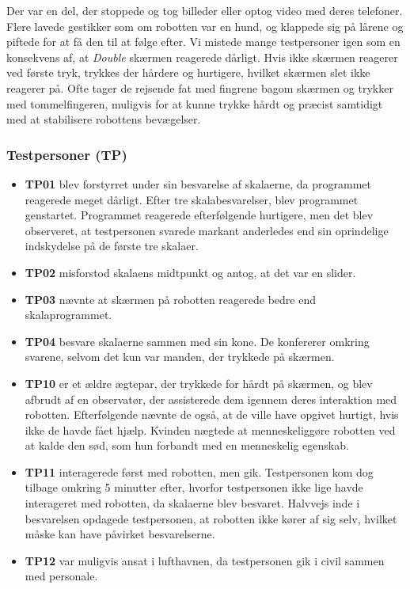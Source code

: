 Der var en del, der stoppede og tog billeder eller optog video med deres telefoner. Flere lavede gestikker som om robotten var en hund, og klappede sig på lårene og piftede for at få den til at følge efter. Vi mistede mange testpersoner igen som en konsekvens af, at \textit{Double} skærmen reagerede dårligt. Hvis ikke skærmen reagerer ved første tryk, trykkes der hårdere og hurtigere, hvilket skærmen slet ikke reagerer på. Ofte tager de rejsende fat med fingrene bagom skærmen og trykker med tommelfingeren, muligvis for at kunne trykke hårdt og præcist samtidigt med at stabilisere robottens bevægelser.

\subsubsection{Testpersoner (TP)}
\begin{itemize}
\item \textbf{TP01} blev forstyrret under sin besvarelse af skalaerne, da programmet reagerede meget dårligt. Efter tre skalabesvarelser, blev programmet genstartet. Programmet reagerede efterfølgende hurtigere, men det blev observeret, at testpersonen svarede markant anderledes end sin oprindelige indskydelse på de første tre skalaer. 
\item \textbf{TP02} misforstod skalaens midtpunkt og antog, at det var en slider. 
\item \textbf{TP03} nævnte at skærmen på robotten reagerede bedre end skalaprogrammet.
\item \textbf{TP04} besvare skalaerne sammen med sin kone. De konfererer omkring svarene, selvom det kun var manden, der trykkede på skærmen.
\item \textbf{TP10} er et ældre ægtepar, der trykkede for hårdt på skærmen, og blev afbrudt af en observatør, der assisterede dem igennem deres interaktion med robotten. Efterfølgende nævnte de også, at de ville have opgivet hurtigt, hvis ikke de havde fået hjælp. Kvinden nægtede at menneskeliggøre robotten ved at kalde den sød, som hun forbandt med en menneskelig egenskab.
\item \textbf{TP11} interagerede først med robotten, men gik. Testpersonen kom dog tilbage omkring 5 minutter efter, hvorfor testpersonen ikke lige havde interageret med robotten, da skalaerne blev besvaret. Halvvejs inde i besvarelsen opdagede testpersonen, at robotten ikke kører af sig selv, hvilket måske kan have påvirket besvarelserne.
\item \textbf{TP12} var muligvis ansat i lufthavnen, da testpersonen gik i civil sammen med personale.

\end{itemize}
